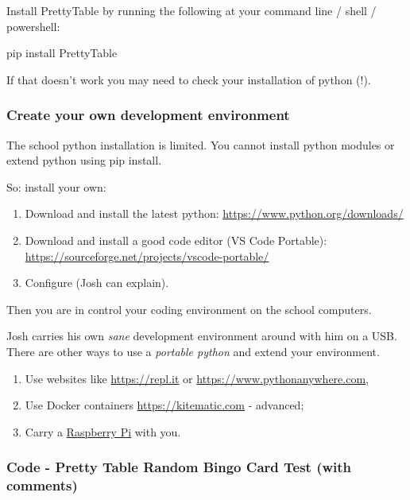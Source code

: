 \documentclass[11pt]{article}
\providecommand{\tightlist}{%
      \setlength{\itemsep}{0pt}\setlength{\parskip}{0pt}}
\begin{document}
    Install PrettyTable by running the following at your command line /
shell / powershell:

pip install PrettyTable

    If that doesn't work you may need to check your installation of python
(!).

    \subsubsection{Create your own development
environment}\label{create-your-own-development-environment}

    The school python installation is limited. You cannot install python
modules or extend python using pip install.

So: install your own:

\begin{enumerate}
\def\labelenumi{\arabic{enumi}.}
\tightlist
\item
  Download and install the latest python:
  \url{https://www.python.org/downloads/}
\item
  Download and install a good code editor (VS Code Portable):
  \url{https://sourceforge.net/projects/vscode-portable/}
\item
  Configure (Josh can explain).
\end{enumerate}

Then you are in control your coding environment on the school computers.

Josh carries his own \emph{sane} development environment around with him
on a USB. There are other ways to use a \emph{portable python} and
extend your environment.

\begin{enumerate}
\def\labelenumi{\arabic{enumi}.}
\tightlist
\item
  Use websites like \url{https://repl.it} or
  \url{https://www.pythonanywhere.com},
\item
  Use Docker containers \url{https://kitematic.com} - advanced;
\item
  Carry a
  \href{https://www.raspberrypi.org/documentation/usage/python/README.md}{Raspberry
  Pi} with you.
\end{enumerate}

    \subsubsection{Code - Pretty Table Random Bingo Card Test (with
comments)}\label{code---pretty-table-random-bingo-card-test-with-comments}
\end{document}
